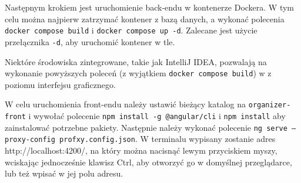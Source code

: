 \documentclass[a4paper,twoside,12pt]{book}
\begin{document}
Następnym krokiem jest uruchomienie back-endu w kontenerze Dockera. W tym celu można najpierw zatrzymać kontener z bazą danych, a wykonać polecenia \texttt{docker compose build} i \texttt{docker compose up -d}. Zalecane jest użycie przełącznika \texttt{-d}, aby uruchomić kontener w tle.

Niektóre środowiska zintegrowane, takie jak IntelliJ IDEA, pozwalają na wykonanie powyższych poleceń (z wyjątkiem \texttt{docker compose build}) w z poziomu interfejsu graficznego.

W celu uruchomienia front-endu należy ustawić bieżący katalog na \texttt{organizer-front} i wywołać polecenie \texttt{npm install -g @angular/cli} i \texttt{npm install} aby zainstalować potrzebne pakiety. Następnie należy wykonać polecenie \texttt{ng serve --proxy-config profxy.config.json}. W terminalu wypisany zostanie adres http://localhost:4200/, na który można nacisnąć lewym przyciskiem myszy, wciskając jednocześnie klawisz Ctrl, aby otworzyć go w domyślnej przeglądarce, lub też wpisać w jej polu adresu.

%
%
%
%
%        
\end{document}
